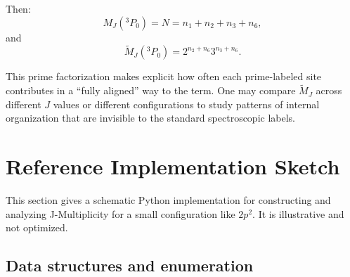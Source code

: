 \documentclass[11pt]{article}
\begin{document}
Then:
\[
M_J(^{3}P_0) = N = n_1 + n_2 + n_3 + n_6,
\]
and
\[
\widetilde{M}_J(^{3}P_0) = 2^{n_2 + n_6} 3^{n_3 + n_6}.
\]

This prime factorization makes explicit how often each prime-labeled site contributes in a ``fully aligned'' way to the term. One may compare \(\widetilde{M}_J\) across different \(J\) values or different configurations to study patterns of internal organization that are invisible to the standard spectroscopic labels.

\section{Reference Implementation Sketch}

This section gives a schematic Python implementation for constructing and analyzing J-Multiplicity for a small configuration like \(2p^2\). It is illustrative and not optimized.

\subsection{Data structures and enumeration}
\end{document}
